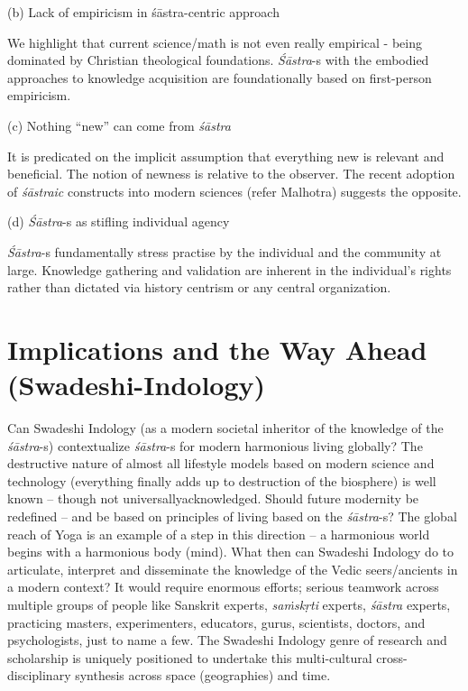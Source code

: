 (b) Lack of empiricism in śāstra-centric approach

We highlight that current science/math is not even really empirical - being dominated by Christian theological foundations. \textit{Śāstra}-s with the embodied approaches to knowledge acquisition are foundationally based on first-person empiricism.

(c) Nothing “new” can come from \textit{śāstra}

It is predicated on the implicit assumption that everything new is relevant and beneficial. The notion of newness is relative to the observer. The recent adoption of \textit{śāstraic} constructs into modern sciences (refer Malhotra) suggests the opposite.

(d) \textit{Śāstra}-s as stifling individual agency

\textit{Śāstra}-s fundamentally stress practise by the individual and the community at large. Knowledge gathering and validation are inherent in the individual's rights rather than dictated via history centrism or any central organization.


\section*{Implications and the Way Ahead (Swadeshi-Indology)}

Can Swadeshi Indology (as a modern societal inheritor of the knowledge of the \textit{śāstra}-s) contextualize \textit{śāstra}-s for modern harmonious living globally? The destructive nature of almost all lifestyle models based on modern science and technology (everything finally adds up to destruction of the biosphere) is well known – though not universally\break acknowledged. Should future modernity be redefined – and be based on principles of living based on the \textit{śāstra}-s? The global reach of Yoga is an example of a step in this direction – a harmonious world begins with a harmonious body (mind). What then can Swadeshi Indology do to articulate, interpret and disseminate the knowledge of the Vedic seers/ancients in a modern context? It would require enormous efforts; serious teamwork across multiple groups of people like Sanskrit experts, \textit{saṁskṛti} experts, \textit{śāstra} experts, practicing masters, experimenters, educators, gurus, scientists, doctors, and psychologists, just to name a few. The Swadeshi Indology genre of research and scholarship is uniquely positioned to undertake this multi-cultural cross-disciplinary synthesis across space (geographies) and time.

